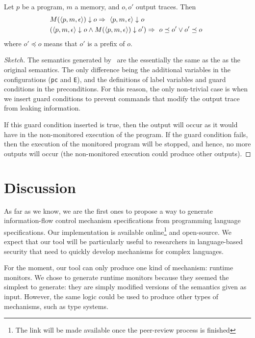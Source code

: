 \documentclass[conference]{IEEEtran}
\begin{document}
\begin{theorem}\label{th:semantic-preservation}
	Let $p$ be a program, $m$ a memory, and $o, o'$ output traces.
	Then
\begin{align*}
	&M(\langle p, m, \epsilon \rangle) \downarrow o \Rightarrow\  \emits{ }{\config{p}{m}{\epsilon}}{o} \\
	&(\emits{ }{\config{p}{m}{\epsilon}}{o}  \wedge M(\langle p, m, \epsilon \rangle) \downarrow o') \Rightarrow\
	o\preceq o' \vee   o'\preceq o\
	\label{}
\end{align*}
	where $o' \preceq o$ means that $o'$ is a prefix of $o$.
\end{theorem}
\begin{proof}[Sketch]
	The semantics generated by \ottifc\ are the essentially the same as the as the original semantics. The only difference being the additional variables in the configurations (\lstinline{pc} and \lstinline{E}), and the definitions of label variables and guard conditions in the preconditions. For this reason, the only non-trivial case is when we insert guard conditions to prevent commands that modify the output trace from leaking information.
	
	If this guard condition inserted is true, then the output will occur as it would have in the non-monitored execution of the program. If the guard condition fails, then the execution of the monitored program will be stopped, and hence, no more outputs will occur (the non-monitored execution could produce other outputs).
\end{proof}


\section{Discussion}\label{section:discussion}
As far as we know, we are the first ones to propose a way to generate information-flow control mechanism specifications from programming language specifications. Our implementation is available online\footnote{The link will be made available once the peer-review process is finished} and open-source. We expect that our tool will be particularly useful to researchers in language-based security that need to quickly develop mechanisms for complex languages. 

For the moment, our tool can only produce one kind of mechanism: runtime monitors. We chose to generate runtime monitors because they seemed the simplest to generate: they are simply modified versions of the semantics given as input. However, the same logic could be used to produce other types of mechanisms, such as type systems.
\end{document}
